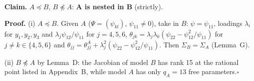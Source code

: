 \documentclass[10pt,a4paper]{article}
\newcommand{\nest}{\preceq}
\newcommand{\nnest}{\not\preceq}
\begin{document}
\par\bigskip
\noindent\textbf{Claim.} $A \nest B$, $B \nnest A$: \textbf{A is nested in B} (strictly).\par\smallskip
\noindent\textbf{Proof.} (i) $A\nest B$. Given $A$ ($\Psi=(\psi_{kl})$, $\psi_{11}\neq0$), take in $B$: $\psi=\psi_{11}$, loadings $\lambda_i$ for $y_1,y_2,y_3$ and $\lambda_j\psi_{12}/\psi_{11}$ for $j=4,5,6$, $\theta_{jk}=\lambda_j\lambda_k(\psi_{22}-\psi_{12}^2/\psi_{11})$ for $j\neq k\in\{4,5,6\}$ and $\theta_{jj}=\theta_{jj}^A+\lambda_j^2(\psi_{22}-\psi_{12}^2/\psi_{11})$. Then $\Sigma_B=\Sigma_A$ (Lemma~G).\par\smallskip
\noindent(ii) $B\nnest A$ by Lemma~D: the Jacobian of model $B$ has rank 15 at the rational point listed in Appendix~B, while model $A$ has only $q_A=13$ free parameters.\hfill$\square$\par\medskip
{}

\clearpage
\end{document}
